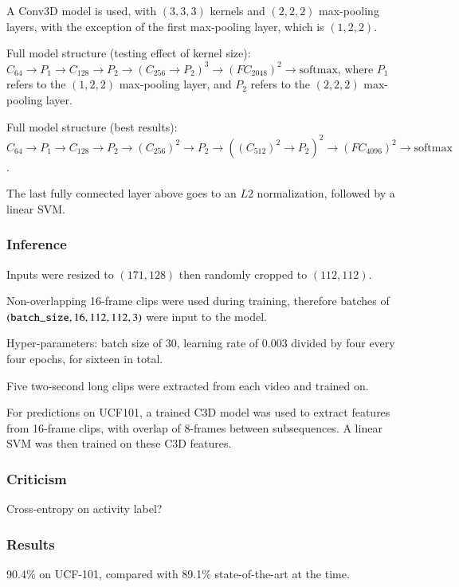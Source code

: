 \documentclass[a4paper, 12pt]{article}
\begin{document}
A Conv3D model is used, with $(3, 3, 3)$ kernels and $(2, 2, 2)$ max-pooling
layers, with the exception of the first max-pooling layer, which is
$(1, 2, 2)$.

Full model structure (testing effect of kernel size):
$C_{64} \rightarrow P_1 \rightarrow C_{128} \rightarrow P_2 \rightarrow
{(C_{256} \rightarrow P_2)}^3 \rightarrow {(FC_{2048})}^2 \rightarrow
\textrm{softmax}$, where $P_1$ refers to the $(1, 2, 2)$ max-pooling layer, and
$P_2$ refers to the $(2, 2, 2)$ max-pooling layer.

Full model structure (best results):
$C_{64} \rightarrow P_1 \rightarrow C_{128} \rightarrow P_2 \rightarrow
{(C_{256})}^2 \rightarrow P_2 \rightarrow
{({(C_{512})}^2 \rightarrow P_2)}^2 \rightarrow {(FC_{4096})}^2 \rightarrow
\textrm{softmax}$.

The last fully connected layer above goes to an $L2$ normalization, followed by
a linear SVM\@.

\subsubsection{Inference}

Inputs were resized to $(171, 128)$ then randomly cropped to $(112, 112)$.

Non-overlapping 16-frame clips were used during training, therefore batches of
$(\verb|batch_size|, 16, 112, 112, 3)$ were input to the model.

Hyper-parameters: batch size of 30, learning rate of 0.003 divided by four
every four epochs, for sixteen in total.

Five two-second long clips were extracted from each video and trained on.

For predictions on UCF101, a trained C3D model was used to extract features
from 16-frame clips, with overlap of 8-frames between subsequences. A linear
SVM was then trained on these C3D features.

\subsubsection{Criticism}

Cross-entropy on activity label?

\subsubsection{Results}

90.4\% on UCF-101, compared with 89.1\% state-of-the-art at the time.
\end{document}
